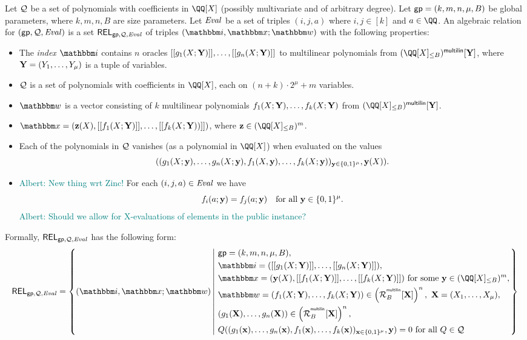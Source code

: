 \documentclass[11pt,letterpaper,usenames,dvipsnames]{article}
\newcommand{\albert}[1]{\textcolor{teal}{Albert: {#1}}}
\begin{document}
Let $\mathcal{Q}$ be a set of polynomials with coefficients in $\QQ[X]$ (possibly multivariate and of arbitrary degree). Let $\mathsf{gp} = (k, m, n, \mu, B)$ be global parameters, where $k,m,n,B$ are size parameters. Let $\text{\emph{Eval}}$ be a set of triples $(i, j, a)$ where $i,j\in [k]$ and $a \in \QQ$. An algebraic relation for $(\mathsf{gp},\mathcal{Q}, \text{\emph{Eval}})$ is a set $\mathsf{REL}_{\mathsf{gp}, \mathcal{Q}, \text{\emph{Eval}}}$ of triples $(\idx, \inp;\wit)$ with the following properties:
\begin{itemize}
	\item The \emph{index} $\idx$ contains $n$ oracles $[[{g_1(X;\mathbf{Y})}]], \ldots, [[{g_n(X;\mathbf{Y})}]]$ to multilinear polynomials from $\mainQpolyring^\multilin[\YY]$, where $\mathbf{Y}=(Y_1,\ldots, Y_\mu) $ is a tuple of variables.
	 \item $\mathcal{Q}$ is a set of polynomials with coefficients in $\QQ[X]$, each on $(n+ k)\cdot 2^\mu + m$ variables.
	\item $\wit$ is a vector consisting of $k$ multilinear polynomials $f_1(X;\mathbf{Y}),\ldots, f_k(X;\mathbf{Y})$ from $\mainQpolyring^{\multilin}[\YY]$. %
	\item $\inp=(\zz(X), \oracle{f_1(X;\YY)}, \ldots, \oracle{f_k(X;\YY))})$, where $\zz\in \mainQpolyring^m$.
	\item Each of the polynomials in $\mathcal{Q}$ vanishes (as a polynomial in $\QQ[X]$) when evaluated on the values $$((g_1(X;\mathbf{y}),\ldots, g_n(X;\mathbf{y}), f_1(X,\mathbf{y}),\ldots, f_k(X;\mathbf{y}))_{\mathbf{y}\in \{0,1\}^\mu}, \mathbf{y}(X)).$$ 
    \item \albert{New thing wrt Zinc!} For each $(i,j,a)\in \text{\emph{Eval}}$ we have
    $$
    f_i(a; \mathbf{y}) = f_j(a;\mathbf{y}) \quad \text{for all } \mathbf{y}\in \{0,1\}^\mu.
    $$
    \albert{Should we allow for X-evaluations of elements in the public instance?}
	\end{itemize}

    Formally, $\mathsf{REL}_{\mathsf{gp},\mathcal{Q},\text{\emph{Eval}}}$ has the following form:
    \begin{equation*}
    \begin{aligned}
    \REL_{\gparams,\cQ,\evalconstraints} = \left\{ (\idx, \inp ; \wit) \left| \ \begin{aligned}
    & \gparams=(k,m,n,\mu, B),  \\
    & \idx = ( \oracle{g_1(X;\YY)},\ldots, \oracle{g_n(X;\YY)}), \\
    & \inp =(\yy(X), \oracle{f_1(X;\YY)}, \ldots, \oracle{f_k(X;\YY)}) \text{ for some } \yy\in \mainQpolyring^{m},\\    
        &\wit = (f_1(X;\YY), \ldots, f_k(X;\YY)) \in \left(\R_B^{^{\multilin}}[\XX]\right)^{n},    \ \XX=(X_1,\ldots, X_\mu),\\
        &(g_1(\XX),\dots,g_n(\XX))\in \left(\R_B^{^{\multilin}}[\XX]\right)^{n},\\
        &Q((g_1(\xx),\ldots, g_n(\xx), f_1(\xx),\ldots, f_k(\xx))_{\xx\in \BB^\mu}, \yy) =0  \text{ for all } Q\in \cQ
    \end{aligned} \right.\right\}
    \end{aligned}
    \end{equation*}
\end{document}

